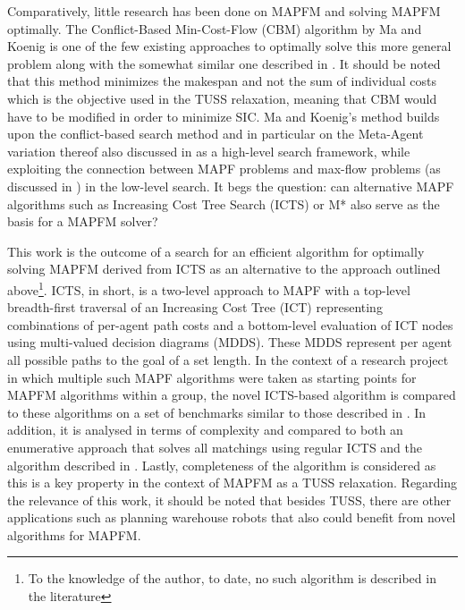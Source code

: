 \documentclass[english]{article}
\begin{document}
	Comparatively, little research has been done on MAPFM and solving MAPFM optimally.
	The Conflict-Based Min-Cost-Flow (CBM) algorithm by Ma and Koenig \cite{ma2016} is one of the few existing approaches to optimally solve this more general problem along with the somewhat similar one described in \cite{henkel2019}. It should be noted that this method minimizes the makespan and not the sum of individual costs which is the objective used in the TUSS relaxation, meaning that CBM would have to be modified in order to minimize SIC.
	Ma and Koenig's method builds upon the conflict-based search method and in particular on the Meta-Agent variation thereof also discussed in \cite{sharon2015} as a high-level search framework, while exploiting the connection between MAPF problems and max-flow problems (as discussed in \cite{yu2013}) in the low-level search.
	It begs the question: can alternative MAPF algorithms such as Increasing Cost Tree Search (ICTS) \cite{sharon2011} or M* \cite{wagner2011} also serve as the basis for a MAPFM solver?
	
	This work is the outcome of a search for an efficient algorithm for optimally solving MAPFM derived from ICTS as an alternative to the approach outlined above\footnote{To the knowledge of the author, to date, no such algorithm is described in the literature}. ICTS, in short, is a two-level approach to MAPF with a top-level breadth-first traversal of an Increasing Cost Tree (ICT) representing combinations of per-agent path costs and a bottom-level evaluation of ICT nodes using multi-valued decision diagrams (MDDS). These MDDS represent per agent all possible paths to the goal of a set length. In the context of a research project in which multiple such MAPF algorithms were taken as starting points for MAPFM algorithms within a group, the novel ICTS-based algorithm is compared to these algorithms on a set of benchmarks similar to those described in \cite{stern2019}. In addition, it is analysed in terms of complexity and compared to both an enumerative approach that solves all matchings using regular ICTS and the algorithm described in \cite{ma2016}. Lastly, completeness of the algorithm is considered as this is a key property in the context of MAPFM as a TUSS relaxation. Regarding the relevance of this work, it should be noted that besides TUSS, there are other applications such as planning warehouse robots \cite{wurman2007} that also could benefit from novel algorithms for MAPFM.
	
\end{document}
